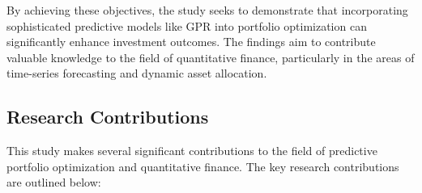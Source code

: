 By achieving these objectives, the study seeks to demonstrate that incorporating sophisticated predictive models like \ac{GPR} into portfolio optimization can significantly enhance investment outcomes. The findings aim to contribute valuable knowledge to the field of quantitative finance, particularly in the areas of time-series forecasting and dynamic asset allocation.

\subsection{Research Contributions}

This study makes several significant contributions to the field of predictive portfolio optimization and quantitative finance. The key research contributions are outlined below:

